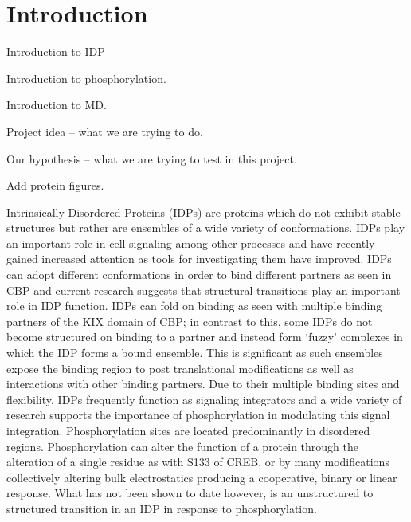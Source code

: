 \section{Introduction} %
\label{sec:introduction}

Introduction to IDP

Introduction to phosphorylation.

Introduction to MD.

Project idea -- what we are trying to do.

Our hypothesis -- what we are trying to test in this project.

Add protein figures.


Intrinsically Disordered Proteins (IDPs) are proteins which do not exhibit stable structures but rather are ensembles of a wide variety of conformations.
IDPs play an important role in cell signaling among other processes and have recently gained increased attention as tools for investigating them have improved.
IDPs can adopt different conformations in order to bind different partners as seen in CBP\cite{d02,w06,q05} and current research suggests that structural transitions play an important role in IDP function.
IDPs can fold on binding as seen with multiple binding partners of the KIX domain of CBP\cite{stc12,stc14}; in contrast to this, some IDPs do not become structured on binding to a partner and instead form ‘fuzzy’ complexes in which the IDP forms a bound ensemble. \cite{b07,m10,tf08}
This is significant as such ensembles expose the binding region to post translational modifications as well as interactions with other binding partners. \cite{f13}
Due to their multiple binding sites and flexibility, IDPs frequently function as signaling integrators \cite{dcriu05,ksxg08} and a wide variety of research supports the importance of phosphorylation in modulating this signal integration.
Phosphorylation sites are located predominantly in disordered regions. \cite{i04}
Phosphorylation can alter the function of a protein through the alteration of a single residue as with S133 of CREB, \cite{c93,r97} or by many modifications collectively altering bulk electrostatics producing a cooperative, binary or linear response. \cite{n01,lfdym13,lffaw10}
What has not been shown to date however, is an unstructured to structured transition in an IDP in response to phosphorylation.


